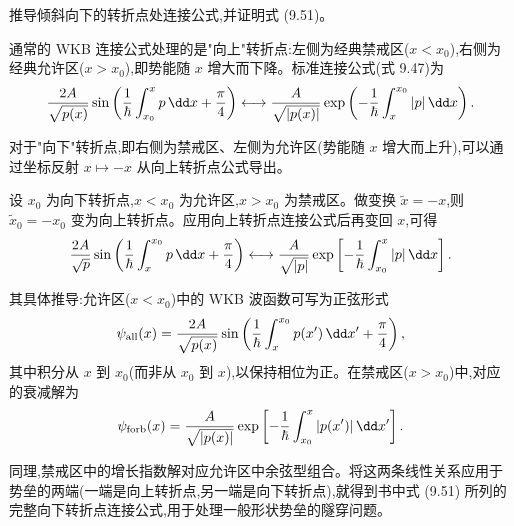 \begin{question}
推导倾斜向下的转折点处连接公式,并证明式 (9.51)。

\par\smallskip
{}

\begin{solution}
通常的 WKB 连接公式处理的是"向上"转折点:左侧为经典禁戒区($x<x_0$),右侧为经典允许区($x>x_0$),即势能随 $x$ 增大而下降。标准连接公式(式 9.47)为
\[
{2A\over\sqrt{p(x)}}\sin\left({1\over\hbar}\int_{x_0}^{x}p\,\dd x+{\pi\over4}\right)
\longleftrightarrow
{A\over\sqrt{|p(x)|}}\exp\left(-{1\over\hbar}\int_{x}^{x_0}|p|\,\dd x\right).
\]

对于"向下"转折点,即右侧为禁戒区、左侧为允许区(势能随 $x$ 增大而上升),可以通过坐标反射 $x\mapsto -x$ 从向上转折点公式导出。

设 $x_0$ 为向下转折点,$x<x_0$ 为允许区,$x>x_0$ 为禁戒区。做变换 $\tilde x=-x$,则 $\tilde x_0=-x_0$ 变为向上转折点。应用向上转折点连接公式后再变回 $x$,可得
\[
{2A\over\sqrt p}\sin\left({1\over\hbar}\int_x^{x_0}p\,\dd x+{\pi\over4}\right)
\longleftrightarrow
{A\over\sqrt{|p|}}\exp\left[-{1\over\hbar}\int_{x_0}^{x}|p|\,\dd x\right].
\]

其具体推导:允许区($x<x_0$)中的 WKB 波函数可写为正弦形式
\[
\psi_{\text{all}}(x)={2A\over\sqrt{p(x)}}\sin\left({1\over\hbar}\int_x^{x_0}p(x')\,\dd x'+{\pi\over4}\right),
\]
其中积分从 $x$ 到 $x_0$(而非从 $x_0$ 到 $x$),以保持相位为正。在禁戒区($x>x_0$)中,对应的衰减解为
\[
\psi_{\text{forb}}(x)={A\over\sqrt{|p(x)|}}\exp\left[-{1\over\hbar}\int_{x_0}^{x}|p(x')|\,\dd x'\right].
\]

同理,禁戒区中的增长指数解对应允许区中余弦型组合。将这两条线性关系应用于势垒的两端(一端是向上转折点,另一端是向下转折点),就得到书中式 (9.51) 所列的完整向下转折点连接公式,用于处理一般形状势垒的隧穿问题。
\end{solution}
\end{question}

